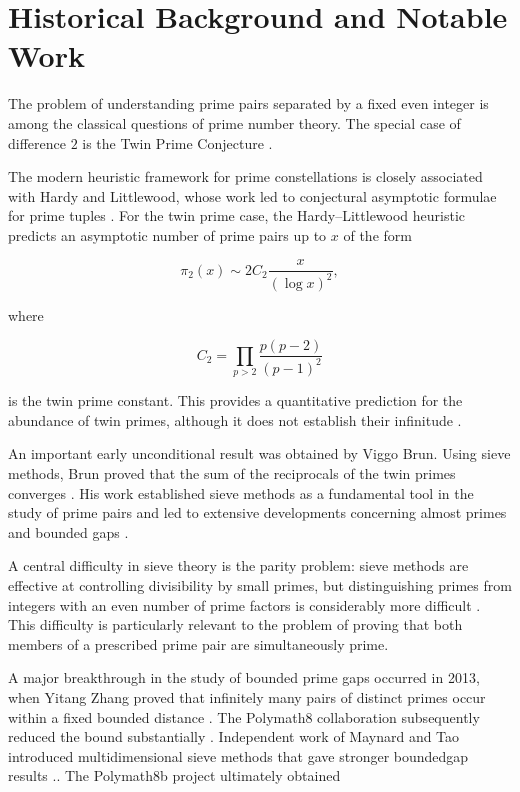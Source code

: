 \documentclass[11pt,a4paper]{article}
\theoremstyle{definition}
\theoremstyle{remark}
\begin{document}
\section{Historical Background and Notable Work}

The problem of understanding prime pairs separated by a fixed even
integer is among the classical questions of prime number theory.  The
special case of difference $2$ is the Twin Prime Conjecture
\cite{hardyWright,halberstamRichert}.

The modern heuristic framework for prime constellations is closely
associated with Hardy and Littlewood, whose work led to conjectural
asymptotic formulae for prime tuples \cite{hardyLittlewood1923}.
For the twin prime case, the Hardy--Littlewood heuristic predicts an
asymptotic number of prime pairs up to $x$ of the form

$$
    \pi_2(x)
    \sim
    2C_2\frac{x}{(\log x)^2},
$$

where

$$
    C_2
    =
    \prod_{p>2}
    \frac{p(p-2)}{(p-1)^2}
$$

is the twin prime constant.  This provides a quantitative prediction
for the abundance of twin primes, although it does not establish their
infinitude \cite{hardyLittlewood1923}.

An important early unconditional result was obtained by Viggo Brun.
Using sieve methods, Brun proved that the sum of the reciprocals of the
twin primes converges \cite{brun1919}.  His work established sieve
methods as a fundamental tool in the study of prime pairs and led to
extensive developments concerning almost primes and bounded gaps
\cite{halberstamRichert,greaves}.

A central difficulty in sieve theory is the parity problem: sieve
methods are effective at controlling divisibility by small primes, but
distinguishing primes from integers with an even number of prime factors
is considerably more difficult \cite{halberstamRichert,greaves}.  This
difficulty is particularly relevant to the problem of proving that both
members of a prescribed prime pair are simultaneously prime.

A major breakthrough in the study of bounded prime gaps occurred in
2013, when Yitang Zhang proved that infinitely many pairs of distinct
primes occur within a fixed bounded distance \cite{zhang2014}.  The
Polymath8 collaboration subsequently reduced the bound substantially
\cite{polymath8}.  Independent work of Maynard and Tao introduced multidimensional
sieve methods that gave stronger boundedgap results
\cite{maynard2015,polymathRetrospective}..  The Polymath8b project ultimately obtained
\end{document}
